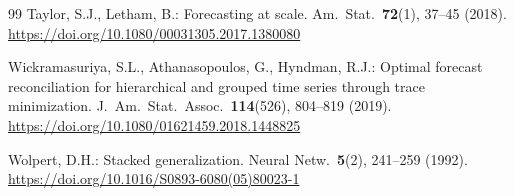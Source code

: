 \documentclass[runningheads]{llncs}
\begin{document}
\begin{thebibliography}{99}
Taylor, S.J., Letham, B.: Forecasting at scale. Am.\ Stat.\
\textbf{72}(1), 37--45 (2018).
\url{https://doi.org/10.1080/00031305.2017.1380080}

Wickramasuriya, S.L., Athanasopoulos, G., Hyndman, R.J.: Optimal
forecast reconciliation for hierarchical and grouped time series
through trace minimization. J.\ Am.\ Stat.\ Assoc.\ \textbf{114}(526),
804--819 (2019).
\url{https://doi.org/10.1080/01621459.2018.1448825}

Wolpert, D.H.: Stacked generalization. Neural Netw.\ \textbf{5}(2),
241--259 (1992).
\url{https://doi.org/10.1016/S0893-6080(05)80023-1}

\end{thebibliography}
\end{document}
